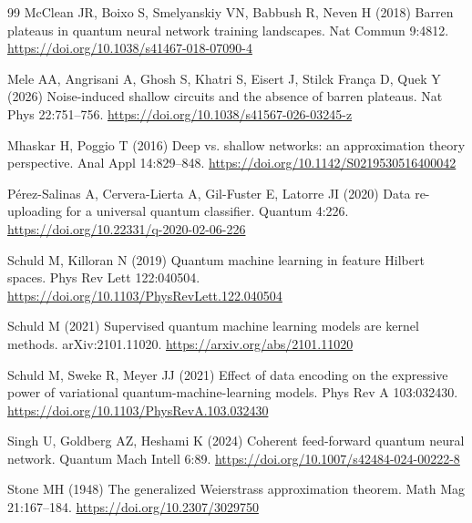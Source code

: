 \documentclass[pdflatex,sn-mathphys,NameDate,iicol]{sn-jnl}
\begin{document}
\begin{thebibliography}{99}
McClean JR, Boixo S, Smelyanskiy VN, Babbush R, Neven H (2018) Barren
plateaus in quantum neural network training landscapes. Nat Commun 9:4812.
\url{https://doi.org/10.1038/s41467-018-07090-4}

Mele AA, Angrisani A, Ghosh S, Khatri S, Eisert J, Stilck Fran{\c c}a D,
Quek Y (2026) Noise-induced shallow circuits and the absence of barren
plateaus. Nat Phys 22:751--756.
\url{https://doi.org/10.1038/s41567-026-03245-z}

Mhaskar H, Poggio T (2016) Deep vs. shallow networks: an approximation
theory perspective. Anal Appl 14:829--848.
\url{https://doi.org/10.1142/S0219530516400042}

P{\'e}rez-Salinas A, Cervera-Lierta A, Gil-Fuster E, Latorre JI (2020)
Data re-uploading for a universal quantum classifier. Quantum 4:226.
\url{https://doi.org/10.22331/q-2020-02-06-226}

Schuld M, Killoran N (2019) Quantum machine learning in feature Hilbert
spaces. Phys Rev Lett 122:040504.
\url{https://doi.org/10.1103/PhysRevLett.122.040504}

Schuld M (2021) Supervised quantum machine learning models are kernel
methods. arXiv:2101.11020. \url{https://arxiv.org/abs/2101.11020}

Schuld M, Sweke R, Meyer JJ (2021) Effect of data encoding on the expressive
power of variational quantum-machine-learning models. Phys Rev A 103:032430.
\url{https://doi.org/10.1103/PhysRevA.103.032430}

Singh U, Goldberg AZ, Heshami K (2024) Coherent feed-forward quantum neural
network. Quantum Mach Intell 6:89.
\url{https://doi.org/10.1007/s42484-024-00222-8}

Stone MH (1948) The generalized Weierstrass approximation theorem.
Math Mag 21:167--184.
\url{https://doi.org/10.2307/3029750}


\end{thebibliography}
\end{document}
